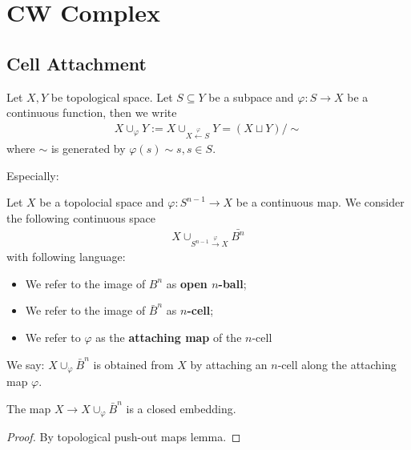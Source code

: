 \documentclass[Total.tex]{subfiles}
\begin{document}
	\chapter{CW Complex}
	\section{Cell Attachment}
	\begin{Def}
		Let $X,Y$ be topological space. Let $S\subseteq Y$ be a subpace and $\varphi:S\rightarrow X$ be a continuous function, then we write
		\begin{gather*}
			X\cup_\varphi Y:=X\cup_{X\stackrel{\varphi}{\leftarrow} S} Y=(X\sqcup Y)/\sim
		\end{gather*}
		where $\sim$ is generated by $\varphi(s)\sim s,s\in S$. 
	\end{Def}
	Especially:
	\begin{Def}
		Let $X$ be a topolocial space and $\varphi:S^{n-1}\rightarrow X$ be a continuous map. We consider the following continuous space
		\begin{gather*}
			X\cup_{S^{n-1}\stackrel{\varphi}{\rightarrow} X}\bar{B^n}
		\end{gather*}
		with following language:
		\begin{itemize}
			\item We refer to the image of $B^n$ as \textbf{open $n$-ball};
			\item We refer to the image of $\bar{B}^n$ as \textbf{$n$-cell};
			\item We refer to $\varphi$ as the \textbf{attaching map} of the $n$-cell
		\end{itemize}
		We say: $X\cup_\varphi \bar{B}^n$ is obtained from $X$ by attaching an $n$-cell along the attaching map $\varphi$. 
	\end{Def}
	\begin{proposition}
		The map $X\rightarrow X\cup_\varphi \bar{B}^n$ is a closed embedding.
	\end{proposition}
	\begin{proof}
		By topological push-out maps lemma.
	\end{proof}
	
\end{document}

